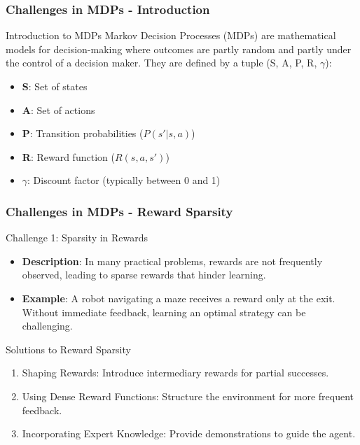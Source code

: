 \documentclass[aspectratio=169]{beamer}
\begin{document}
\begin{frame}[fragile]
    \frametitle{Challenges in MDPs - Introduction}
    \begin{block}{Introduction to MDPs}
        Markov Decision Processes (MDPs) are mathematical models for decision-making where outcomes are partly random and partly under the control of a decision maker. They are defined by a tuple (S, A, P, R, $\gamma$):
    \end{block}
    \begin{itemize}
        \item \textbf{S}: Set of states
        \item \textbf{A}: Set of actions
        \item \textbf{P}: Transition probabilities ($P(s' | s, a)$)
        \item \textbf{R}: Reward function ($R(s, a, s')$)
        \item \textbf{$\gamma$}: Discount factor (typically between 0 and 1)
    \end{itemize}
\end{frame}

\begin{frame}[fragile]
    \frametitle{Challenges in MDPs - Reward Sparsity}
    \begin{block}{Challenge 1: Sparsity in Rewards}
        \begin{itemize}
            \item \textbf{Description}: In many practical problems, rewards are not frequently observed, leading to sparse rewards that hinder learning.
            \item \textbf{Example}: A robot navigating a maze receives a reward only at the exit. Without immediate feedback, learning an optimal strategy can be challenging.
        \end{itemize}
    \end{block}

    \begin{block}{Solutions to Reward Sparsity}
        \begin{enumerate}
            \item Shaping Rewards: Introduce intermediary rewards for partial successes.
            \item Using Dense Reward Functions: Structure the environment for more frequent feedback.
            \item Incorporating Expert Knowledge: Provide demonstrations to guide the agent.
        \end{enumerate}
    \end{block}
\end{frame}
\end{document}
